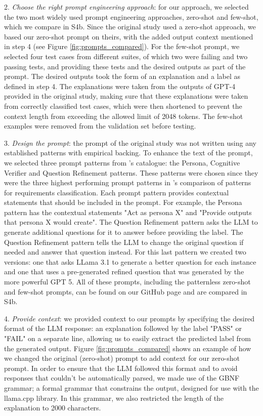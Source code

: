 \documentclass[a4paper]{article}
\begin{document}
2. \textit{Choose the right prompt engineering approach}: for our approach, we selected the two most widely used prompt engineering approaches, zero-shot and few-shot, which we compare in S4b. Since the original study used a zero-shot approach, we based our zero-shot prompt on theirs, with the added output context mentioned in step 4 (see Figure \ref{fig:prompts_compared}). For the few-shot prompt, we selected four test cases from different suites, of which two were failing and two passing tests, and providing these tests and the desired outputs as part of the prompt. The desired outputs took the form of an explanation and a label as defined in step 4. The explanations were taken from the outputs of GPT-4 provided in the original study, making sure that these explanations were taken from correctly classified test cases, which were then shortened to prevent the context length from exceeding the allowed limit of 2048 tokens. The few-shot examples were removed from the validation set before testing.

3. \textit{Design the prompt}: the prompt of the original study was not written using any established patterns with empirical backing. To enhance the text of the prompt, we selected three prompt patterns from \textcite{white2023}'s catalogue: the Persona, Cognitive Verifier and Question Refinement patterns. These patterns were chosen since they were the three highest performing prompt patterns in \textcite{ronanki2023}'s comparison of patterns for requirements classification. Each prompt pattern provides contextual statements that should be included in the prompt. For example, the Persona pattern has the contextual statements "Act as persona X" and "Provide outputs that persona X would create". The Question Refinement pattern asks the LLM to generate additional questions for it to answer before providing the label. The Question Refinement pattern tells the LLM to change the original question if needed and answer that question instead. For this last pattern we created two versions: one that asks LLama 3.1 to generate a better question for each instance and one that uses a pre-generated refined question that was generated by the more powerful GPT 5. All of these prompts, including the patternless zero-shot and few-shot prompts, can be found on our GitHub page and are compared in S4b.

4. \textit{Provide context}: we provided context to our prompts by specifying the desired format of the LLM response: an explanation followed by the label "PASS" or "FAIL" on a separate line, allowing us to easily extract the predicted label from the generated output. Figure \ref{fig:prompts_compared} shows an example of how we changed the original (zero-shot) prompt to add context for our zero-shot prompt. In order to ensure that the LLM followed this format and to avoid responses that couldn't be automatically parsed, we made use of the GBNF grammar; a formal grammar that constrains the output, designed for use with the llama.cpp library. In this grammar, we also restricted the length of the explanation to 2000 characters. 
\end{document}
